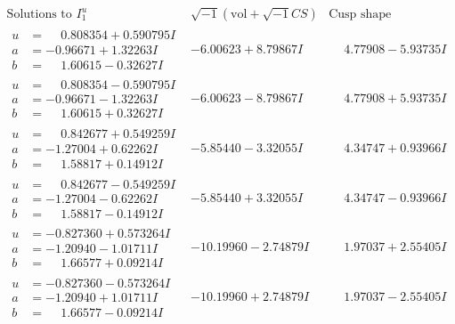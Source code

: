 \documentclass[1p]{elsarticle_modified}
\theoremstyle{definition}
\newcommand{\I}{\sqrt{-1}}
\begin{document}
$$\begin{array}{c|c|c}  
\text{Solutions to }I^u_{1}& \I (\text{vol} + \sqrt{-1}CS) & \text{Cusp shape}\\
 \hline 
\begin{aligned}
u &= \phantom{-}0.808354 + 0.590795 I \\
a &= -0.96671 + 1.32263 I \\
b &= \phantom{-}1.60615 - 0.32627 I\end{aligned}
 & -6.00623 + 8.79867 I & \phantom{-}4.77908 - 5.93735 I \\ \hline\begin{aligned}
u &= \phantom{-}0.808354 - 0.590795 I \\
a &= -0.96671 - 1.32263 I \\
b &= \phantom{-}1.60615 + 0.32627 I\end{aligned}
 & -6.00623 - 8.79867 I & \phantom{-}4.77908 + 5.93735 I \\ \hline\begin{aligned}
u &= \phantom{-}0.842677 + 0.549259 I \\
a &= -1.27004 + 0.62262 I \\
b &= \phantom{-}1.58817 + 0.14912 I\end{aligned}
 & -5.85440 - 3.32055 I & \phantom{-}4.34747 + 0.93966 I \\ \hline\begin{aligned}
u &= \phantom{-}0.842677 - 0.549259 I \\
a &= -1.27004 - 0.62262 I \\
b &= \phantom{-}1.58817 - 0.14912 I\end{aligned}
 & -5.85440 + 3.32055 I & \phantom{-}4.34747 - 0.93966 I \\ \hline\begin{aligned}
u &= -0.827360 + 0.573264 I \\
a &= -1.20940 - 1.01711 I \\
b &= \phantom{-}1.66577 + 0.09214 I\end{aligned}
 & -10.19960 - 2.74879 I & \phantom{-}1.97037 + 2.55405 I \\ \hline\begin{aligned}
u &= -0.827360 - 0.573264 I \\
a &= -1.20940 + 1.01711 I \\
b &= \phantom{-}1.66577 - 0.09214 I\end{aligned}
 & -10.19960 + 2.74879 I & \phantom{-}1.97037 - 2.55405 I \\ \hline\begin{aligned}

\end{aligned}
\end{array}$$
\end{document}
